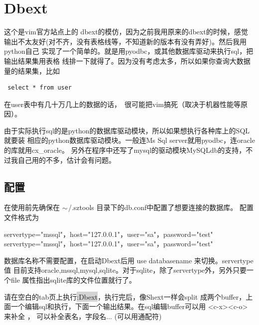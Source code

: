 \documentclass[oneside,openany]{book}
\begin{document}
\section{Dbext}

  这个是vim官方站点上的 dbext的模仿，因为之前我用原来的dbext的时候，感觉
输出不太友好(对不齐，没有表格线等，不知道新的版本有没有弄好)。然后我用python自己
实现了一个简单的。就是用pyodbc，或其他数据库驱动来执行sql，把输出结果集用表格
线排一下就得了。因为没有考虑太多，所以如果你查询大数据量的结果集，比如 
\begin{verbatim} select * from user \end{verbatim}
在user表中有几十万几上的数据的话，　很可能把vim搞死（取决于机器性能等原因）。

由于实际执行sql的是python的数据库驱动模块，所以如果想执行各种库上的SQL就要装
相应的python数据库驱动模块。一般连Ms Sql server就用pyodbc，连oracle的库就用cx\_oracle。
另外在程序中还写了mysql的驱动模块MySQLdb的支持，不过我自己用的不多，估计会有问题。

\subsection{配置}
   在使用前先确保在 $\tiny{\sim}$/.sztools 目录下的db.conf中配置了想要连接的数据库。
   配置文件格式为
    \begin{mdframed}[style=SmallFrame]
    \begin{flushleft}
    servertype="mssql"，host="127.0.0.1"，user="sa"，password="test"\newline
    servertype="mssql"，host="127.0.0.1"，user="sa"，password="test"
    \end{flushleft}
    \end{mdframed}
    数据库名称不需要配置，在启动Dbext后用 use databasename 来切换。servertype值
目前支持oracle,mssql,mysql,sqlite。对于sqlite，除了servertype外，另外只要一个file
属性指出sqlite库的文件位置就行了。

    请在空白的tab页上执行\colorbox{lightgray}{:Dbext}，执行完后，像Shext一样会split
成两个buffer，上面一个编辑sql和执行，下面一个输出结果。在sql编辑buffer可以用 
<c-x><c-o> 来补全 ， 可以补全表名，字段名... (可以用通配符) 
\end{document}
